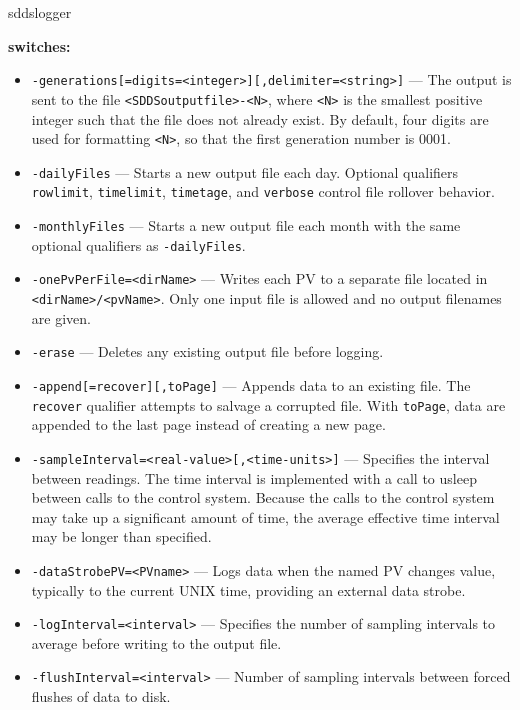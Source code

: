 \begin{sddsprog}{sddslogger}
\item \textbf{switches:}
\begin{itemize}
  \item {\verb+-generations[=digits=<integer>][,delimiter=<string>]+} ---
      The output is sent to the file \verb+<SDDSoutputfile>-<N>+, where \verb+<N>+ is
      the smallest positive integer such that the file does not already
      exist.  By default, four digits are used for formatting \verb+<N>+, so that
      the first generation number is 0001.
  \item {\tt -dailyFiles} --- Starts a new output file each day. Optional qualifiers
      \verb+rowlimit+, \verb+timelimit+, \verb+timetage+, and \verb+verbose+ control
      file rollover behavior.
  \item {\tt -monthlyFiles} --- Starts a new output file each month with the same optional
      qualifiers as \verb+-dailyFiles+.
  \item {\tt -onePvPerFile=<dirName>} --- Writes each PV to a separate file located in
      \verb+<dirName>/<pvName>+. Only one input file is allowed and no output
      filenames are given.
  \item {\tt -erase} --- Deletes any existing output file before logging.
  \item {\tt -append[=recover][,toPage]} --- Appends data to an existing file.
      The \verb+recover+ qualifier attempts to salvage a corrupted file.
      With \verb+toPage+, data are appended to the last page instead of
      creating a new page.
  \item {\tt -sampleInterval=<real-value>[,<time-units>]} --- Specifies the interval between readings. The time
      interval is implemented with a call to usleep between calls to the control system.
      Because the calls to the control system may take up a significant amount of time, the average
      effective time interval may be longer than specified.
  \item {\tt -dataStrobePV=<PVname>} --- Logs data when the named PV changes value,
      typically to the current UNIX time, providing an external data strobe.
  \item {\tt -logInterval=<interval>} --- Specifies the number of sampling intervals to average before
      writing to the output file.
  \item {\tt -flushInterval=<interval>} --- Number of sampling intervals between forced flushes of data to disk.

\end{itemize}
\end{sddsprog}
